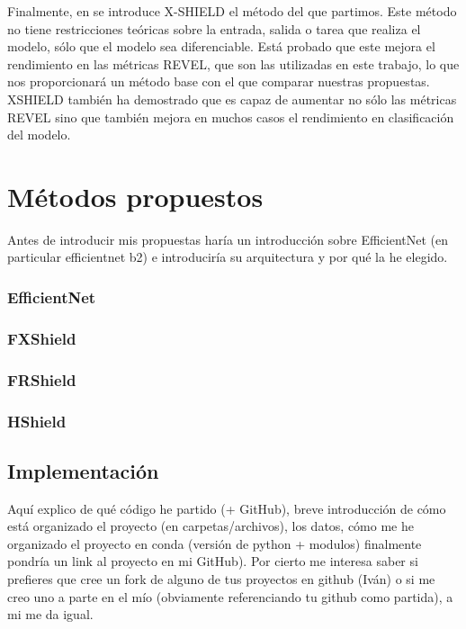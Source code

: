 Finalmente, en \cite{XSHIELD} se introduce X-SHIELD el método del que partimos. Este método no tiene restricciones teóricas sobre la entrada, salida o tarea que realiza el modelo, sólo que el modelo sea diferenciable. Está probado que este mejora el rendimiento en las métricas REVEL, que son las utilizadas en este trabajo, lo que nos proporcionará un método base con el que comparar nuestras propuestas. XSHIELD también ha demostrado que es capaz de aumentar no sólo las métricas REVEL sino que también mejora en muchos casos el rendimiento en clasificación del modelo.


\newpage
\chapter{Métodos propuestos} \label{cap:met}
 Antes de introducir mis propuestas haría un introducción sobre EfficientNet (en particular efficientnet b2) e introduciría su arquitectura y por qué la he elegido. 

\subsection*{EfficientNet}

\clearpage
\subsection{FXShield}
\subsection{FRShield}
\subsection{HShield}

\clearpage

\section{Implementación}

Aquí explico de qué código he partido (+ GitHub), breve introducción de cómo está organizado el proyecto (en carpetas/archivos), los datos, cómo me he organizado el proyecto en conda (versión de python + modulos) finalmente pondría un link al proyecto en mi GitHub). Por cierto me interesa saber si prefieres que cree un fork de alguno de tus proyectos en github (Iván) o si me creo uno a parte en el mío (obviamente referenciando tu github como partida), a mi me da igual.



